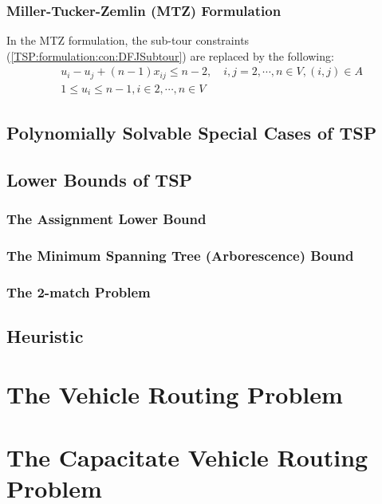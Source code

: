				\subsection{Miller-Tucker-Zemlin (MTZ) Formulation}
					In the MTZ formulation, the sub-tour constraints (\ref{TSP:formulation:con:DFJSubtour}) are replaced by the following:
					\begin{align}
						&u_i - u_j + (n - 1) x_{ij} \le n - 2, \quad i, j = 2, \cdots, n \in V, (i, j) \in A\\
						&1 \le u_i \le n - 1, i \in 2, \cdots, n \in V
					\end{align}


			\section{Polynomially Solvable Special Cases of TSP}

			\section{Lower Bounds of TSP}
				\subsection{The Assignment Lower Bound}

				\subsection{The Minimum Spanning Tree (Arborescence) Bound}

				\subsection{The 2-match Problem}

			\section{Heuristic}				

		\chapter{The Vehicle Routing Problem}

		\chapter{The Capacitate Vehicle Routing Problem}
